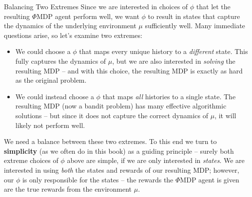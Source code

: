 \documentclass[aspectratio=169,10pt]{beamer}
\begin{document}
\begin{frame}{Balancing Two Extremes}
  Since we are interested in choices of $\phi$ that let the resulting
  $\Phi$MDP agent perform well, we want $\phi$ to result in states that
  capture the dynamics of the underlying environment $\mu$ sufficiently
  well. Many immediate questions arise, so let's examine two extremes:

  \begin{itemize}
    \item We could choose a $\phi$ that maps every unique history to a
      \emph{different} state. This fully captures the dynamics of $\mu$,
      but we are also interested in \emph{solving} the resulting MDP --
      and with this choice, the resulting MDP is exactly as hard as the
      original problem.
    \item We could instead choose a $\phi$ that maps \emph{all} histories
      to a single state. The resulting MDP (now a bandit problem) has
      many effective algorithmic solutions -- but since it does not
      capture the correct dynamics of $\mu$, it will likely not perform
      well.
  \end{itemize}
  We need a balance between these two extremes. To this end we turn to
  \textbf{simplicity} (as we often do in this book) as a guiding
  principle -- surely both extreme choices of $\phi$ above are simple, if
  we are only interested in \emph{states}. We are interested in using
  \emph{both} the states and rewards of our resulting MDP; however, our
  $\phi$ is only responsible for the states -- the rewards the $\Phi$MDP
  agent is given are the true rewards from the environment $\mu$.
\end{frame}
\end{document}
